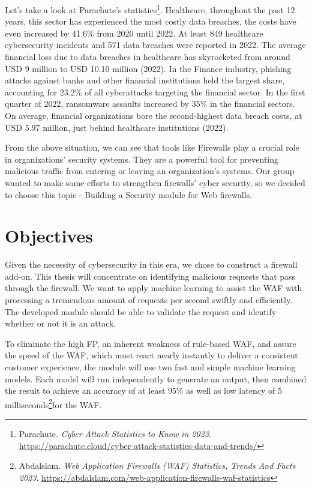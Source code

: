 Let's take a look at Parachute's statistics\footnote{Parachute. \textit{Cyber Attack Statistics to Know in 2023}. \url{https://parachute.cloud/cyber-attack-statistics-data-and-trends/}}. Healthcare, throughout the past 12 years, this sector has experienced the most costly data breaches, the costs have even increased by 41.6\% from 2020 until 2022. At least 849 healthcare cybersecurity incidents and 571 data breaches were reported in 2022. The average financial loss due to data breaches in healthcare has skyrocketed from around USD 9 million to USD 10.10 million (2022). In the Finance industry, phishing attacks against banks and other financial institutions held the largest share, accounting for 23.2\% of all cyberattacks targeting the financial sector. In the first quarter of 2022, ransomware assaults increased by 35\% in the financial sectors. On average, financial organizations bore the second-highest data breach costs, at USD 5.97 million, just behind healthcare institutions (2022). 

From the above situation, we can see that tools like Firewalls play a crucial role in organizations' security systems. They are a powerful tool for preventing malicious traffic from entering or leaving an organization’s systems. Our group wanted to make some efforts to strengthen firewalls' cyber security, so we decided to choose this topic - Building a Security module for Web firewalls.
\newpage
\section{Objectives}
\label{sec:objectives}
Given the necessity of cybersecurity in this era, we chose to construct a firewall add-on. This thesis will concentrate on identifying malicious requests that pass through the firewall. We want to apply machine learning to assist the WAF with processing a tremendous amount of requests per second swiftly and efficiently. The developed module should be able to validate the request and identify whether or not it is an attack.

To eliminate the high FP, an inherent weakness of rule-based WAF, and assure the speed of the WAF, which must react nearly instantly to deliver a consistent customer experience, the module will use two fast and simple machine learning models. Each model will run independently to generate an output, then combined the result to achieve an accuracy of at least 95\% as well as low latency of 5 milliseconds\footnote{Abdalslam. \textit{Web Application Firewalls (WAF) Statistics, Trends And Facts 2023}. 
\url{https://abdalslam.com/web-application-firewalls-waf-statistics}}for the WAF.

